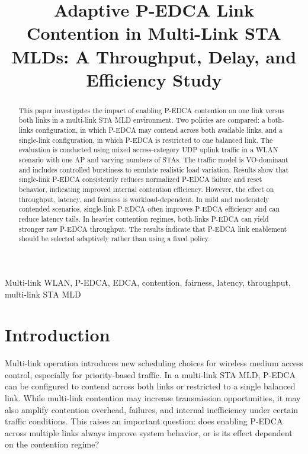 \documentclass[conference]{IEEEtran}
\begin{document}
\title{Adaptive P-EDCA Link Contention in Multi-Link STA MLDs: A Throughput, Delay, and Efficiency Study}

\author{
}

\maketitle

\begin{abstract}
This paper investigates the impact of enabling P-EDCA contention on one link versus both links in a multi-link STA MLD environment. Two policies are compared: a both-links configuration, in which P-EDCA may contend across both available links, and a single-link configuration, in which P-EDCA is restricted to one balanced link. The evaluation is conducted using mixed access-category UDP uplink traffic in a WLAN scenario with one AP and varying numbers of STAs. The traffic model is VO-dominant and includes controlled burstiness to emulate realistic load variation. Results show that single-link P-EDCA consistently reduces normalized P-EDCA failure and reset behavior, indicating improved internal contention efficiency. However, the effect on throughput, latency, and fairness is workload-dependent. In mild and moderately contended scenarios, single-link P-EDCA often improves P-EDCA efficiency and can reduce latency tails. In heavier contention regimes, both-links P-EDCA can yield stronger raw P-EDCA throughput. The results indicate that P-EDCA link enablement should be selected adaptively rather than using a fixed policy.
\end{abstract}

\begin{IEEEkeywords}
Multi-link WLAN, P-EDCA, EDCA, contention, fairness, latency, throughput, multi-link STA MLD
\end{IEEEkeywords}

\section{Introduction}
Multi-link operation introduces new scheduling choices for wireless medium access control, especially for priority-based traffic. In a multi-link STA MLD, P-EDCA can be configured to contend across both links or restricted to a single balanced link. While multi-link contention may increase transmission opportunities, it may also amplify contention overhead, failures, and internal inefficiency under certain traffic conditions. This raises an important question: does enabling P-EDCA across multiple links always improve system behavior, or is its effect dependent on the contention regime?
\end{document}
